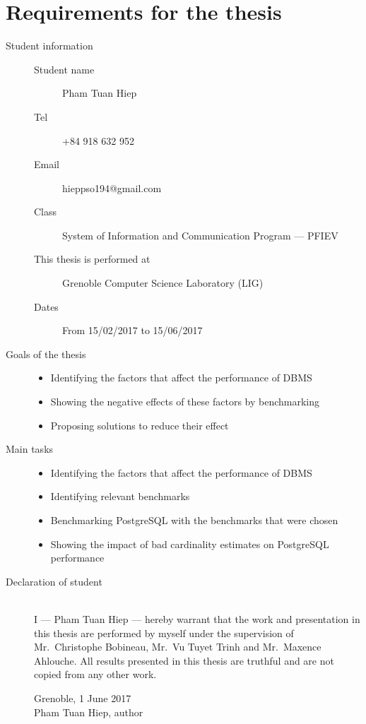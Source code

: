 \section*{\centering Requirements for the thesis}

\begin{description}

    \item[Student information] \hfill
        \begin{description}
            \item[Student name] Pham Tuan Hiep
            \item[Tel] +84 918 632 952
            \item[Email] hieppso194@gmail.com
            \item[Class] System of Information and Communication Program --- PFIEV
            \item[This thesis is performed at] Grenoble Computer Science Laboratory (LIG)
            \item[Dates] From 15/02/2017 to 15/06/2017
        \end{description}

    \item[Goals of the thesis] \hfill
        \begin{itemize}
            \item Identifying the factors that affect the performance of DBMS
            \item Showing the negative effects of these factors by benchmarking
            \item Proposing solutions to reduce their effect
        \end{itemize}

    \item[Main tasks] \hfill
        \begin{itemize}
            \item Identifying the factors that affect the performance of DBMS
            \item Identifying relevant benchmarks
            \item Benchmarking PostgreSQL with the benchmarks that were chosen
            \item Showing the impact of bad cardinality estimates on PostgreSQL performance
        \end{itemize}

    \item[Declaration of student] \hfill \\
        I --– Pham Tuan Hiep --- hereby warrant that the work and presentation in
        this thesis are performed by myself under the supervision of Mr.\ Christophe
        Bobineau, Mr.\ Vu Tuyet Trinh and Mr.\ Maxence Ahlouche. All results presented in
        this thesis are truthful and are not copied from any other work.
        \begin{flushright}
            Grenoble, 1 June 2017\\
            \vspace{1.5cm}
            Pham Tuan Hiep, author
        \end{flushright}


\end{description}
